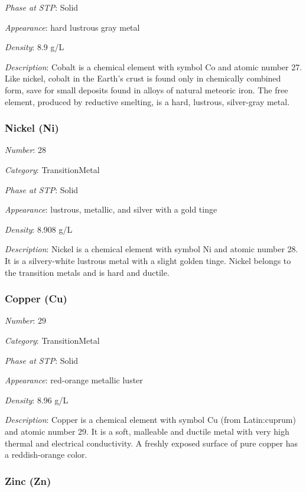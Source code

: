\documentclass{article}
\begin{document}
\textit{Phase at STP}: Solid

\textit{Appearance}: hard lustrous gray metal

\textit{Density}: 8.9 g/L

\textit{Description}: Cobalt is a chemical element with symbol Co and atomic number 27. Like nickel, cobalt in the Earth's crust is found only in chemically combined form, save for small deposits found in alloys of natural meteoric iron. The free element, produced by reductive smelting, is a hard, lustrous, silver-gray metal.

\hypertarget{subsubsection::Ni}{}\subsubsection{Nickel (Ni)}

\textit{Number}: 28

\textit{Category}: TransitionMetal

\textit{Phase at STP}: Solid

\textit{Appearance}: lustrous, metallic, and silver with a gold tinge

\textit{Density}: 8.908 g/L

\textit{Description}: Nickel is a chemical element with symbol Ni and atomic number 28. It is a silvery-white lustrous metal with a slight golden tinge. Nickel belongs to the transition metals and is hard and ductile.

\hypertarget{subsubsection::Cu}{}\subsubsection{Copper (Cu)}

\textit{Number}: 29

\textit{Category}: TransitionMetal

\textit{Phase at STP}: Solid

\textit{Appearance}: red-orange metallic luster

\textit{Density}: 8.96 g/L

\textit{Description}: Copper is a chemical element with symbol Cu (from Latin:cuprum) and atomic number 29. It is a soft, malleable and ductile metal with very high thermal and electrical conductivity. A freshly exposed surface of pure copper has a reddish-orange color.

\hypertarget{subsubsection::Zn}{}\subsubsection{Zinc (Zn)}
\end{document}

